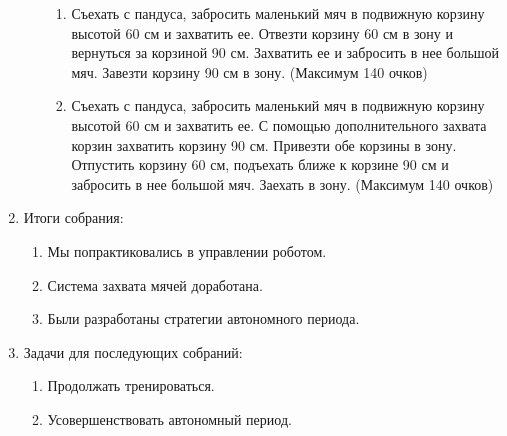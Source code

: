 \begin{enumerate}
\begin{enumerate}
\begin{enumerate}
        	\item Съехать с пандуса, забросить маленький мяч в подвижную корзину высотой 60 см и захватить ее. Отвезти корзину 60 см в зону и вернуться за корзиной 90 см. Захватить ее и забросить в нее большой мяч. Завезти корзину 90 см в зону. (Максимум 140 очков)
        	
        	\item Съехать с пандуса, забросить маленький мяч в подвижную корзину высотой 60 см и захватить ее. С помощью дополнительного захвата корзин захватить корзину 90 см. Привезти обе корзины в зону. Отпустить корзину 60 см, подъехать ближе к корзине 90 см и забросить в нее большой мяч. Заехать в зону. (Максимум 140 очков)
        	
        \end{enumerate}

	\end{enumerate}
	
	\item Итоги собрания:
	\begin{enumerate}
		
		\item Мы попрактиковались в управлении роботом.
		
		\item Система захвата мячей доработана.
		
		\item Были разработаны стратегии автономного периода.
		
	\end{enumerate}
	
	\item Задачи для последующих собраний:
	\begin{enumerate}
		
		\item Продолжать тренироваться.
		
		\item Усовершенствовать автономный период.
			
	\end{enumerate}
\end{enumerate}
\fillpage

